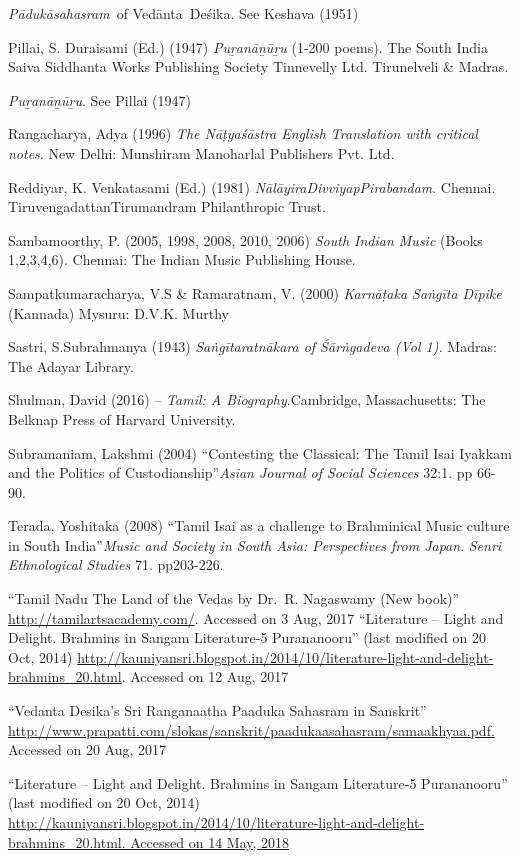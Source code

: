 \begin{thebibliography}{99}
  \textit{Pādukāsahasram} of Vedānta Deśika. See Keshava (1951)

  Pillai, S. Duraisami (Ed.) (1947) \textit{Puṟanāṉūṟu} (1-200 poems). The South India Saiva Siddhanta Works Publishing Society Tinnevelly Ltd. Tirunelveli \& Madras.

  \textit{Puṟanāṉūṟu}. See Pillai (1947)

  Rangacharya, Adya (1996) \textit{The Nāṭyaśāstra English Translation with critical notes}. New Delhi: Munshiram Manoharlal Publishers Pvt. Ltd.

  Reddiyar, K. Venkatasami (Ed.) (1981) \textit{NālāyiraDivviyapPirabandam}. Chennai. TiruvengadattanTirumandram Philanthropic Trust.

  Sambamoorthy, P. (2005, 1998, 2008, 2010, 2006) \textit{South Indian Music} (Books 1,2,3,4,6). Chennai: The Indian Music Publishing House.

  Sampatkumaracharya, V.S \& Ramaratnam, V. (2000) \textit{Karnāṭaka Saṅgīta Dīpike} (Kannada) Mysuru: D.V.K. Murthy

  Sastri, S.Subrahmanya (1943) \textit{Saṅgītaratnākara of Śārṅgadeva (Vol 1).} Madras: The Adayar Library.

  Shulman, David (2016) – \textit{Tamil: A Biography}.Cambridge, Massachusetts: The Belknap Press of Harvard University.

  Subramaniam, Lakshmi (2004) “Contesting the Classical: The Tamil Isai Iyakkam and the Politics of Custodianship”\textit{Asian Journal of Social Sciences} 32:1. pp 66-90.

  Terada, Yoshitaka (2008) “Tamil Isai as a challenge to Brahminical Music culture in South India”\textit{Music and Society in South Asia: Perspectives from Japan}. \textit{Senri Ethnological Studies }71. pp203-226.

  “Tamil Nadu The Land of the Vedas by Dr.\ R. Nagaswamy (New book)” \url{http://tamilartsacademy.com/}. Accessed on 3 Aug, 2017 “Literature – Light and Delight. Brahmins in Sangam Literature-5 Purananooru” (last modified on 20 Oct, 2014) \url{http://kauniyansri.blogspot.in/2014/10/literature-light-and-delight-brahmins_20.html}. Accessed on 12 Aug, 2017

  “Vedanta Desika’s Sri Ranganaatha Paaduka Sahasram in Sanskrit” \url{http://www.prapatti.com/slokas/sanskrit/paadukaasahasram/samaakhyaa.pdf.} Accessed on 20 Aug, 2017

  “Literature – Light and Delight. Brahmins in Sangam Literature-5 Purananooru” (last modified on 20 Oct, 2014) \url{http://kauniyansri.blogspot.in/2014/10/literature-light-and-delight-brahmins_20.html. Accessed on 14 May, 2018}

 \end{thebibliography}

\theendnotes

